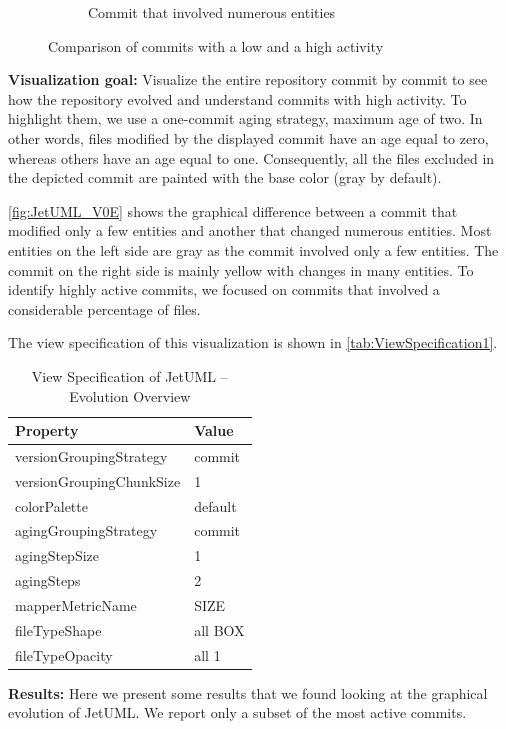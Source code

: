 \begin{figure}[t]
\begin{subfigure}{0.42\textwidth}
        \caption{Commit that involved numerous entities} \label{fig:JetUML_V0E1}
    \end{subfigure}
    \caption{Comparison of commits with a low and a high activity} 
    \label{fig:JetUML_V0E}
\end{figure}
\bigbreak
\noindent
\textbf{Visualization goal:} Visualize the entire repository commit by commit to see how the repository evolved and understand commits with high activity. 
To highlight them, we use a one-commit aging strategy, maximum age of two. In other words, files modified by the displayed commit have an age equal to zero, whereas others have an age equal to one.
Consequently, all the files excluded in the depicted commit are painted with the base color (gray by default). 

\autoref{fig:JetUML_V0E} shows the graphical difference between a commit that modified only a few entities and another that changed numerous entities. Most entities on the left side are gray as the commit involved only a few entities. The commit on the right side is mainly yellow with changes in many entities. To identify highly active commits, we focused on commits that involved a considerable percentage of files.

The view specification of this visualization is shown in \autoref{tab:ViewSpecification1}.
\begin{table}[h]
	\small
    \centering
    \begin{tabular}{@{}ll@{}} 
        \toprule
        \textbf{Property} & \textbf{Value} \\\midrule
        versionGroupingStrategy & commit\\ 
		versionGroupingChunkSize & 1\\
		colorPalette & default\\
		agingGroupingStrategy & commit \\
		agingStepSize & 1 \\
		agingSteps & 2 \\
		mapperMetricName & SIZE \\
		fileTypeShape & all BOX \\
		fileTypeOpacity & all 1 \\\bottomrule
    \end{tabular}
    \caption{View Specification of JetUML – Evolution Overview}
    \label{tab:ViewSpecification1}
\end{table}

\bigbreak
\noindent
\textbf{Results:}
Here we present some results that we found looking at the graphical evolution of JetUML. 
We report only a subset of the most active commits. 

